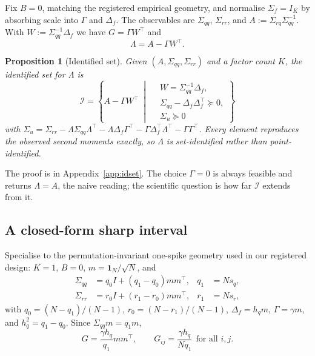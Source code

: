 \documentclass[10pt,twocolumn]{article}
\newtheorem{proposition}{Proposition}
\theoremstyle{remark}
\begin{document}
Fix $B=0$, matching the registered empirical geometry, and normalise
$\Sigma_f=I_K$ by absorbing scale into $\Gamma$ and $\Delta_f$. The observables
are $\Sigma_{qq}$, $\Sigma_{rr}$, and $A:=\Sigma_{rq}\Sigma_{qq}^{-1}$. With
$W:=\Sigma_{qq}^{-1}\Delta_f$ we have $G=\Gamma W^\top$ and
\begin{equation}
\Lambda = A-\Gamma W^\top. \label{eq:lamAW}
\end{equation}

\begin{proposition}[Identified set]
\label{prop:idset}
Given $(A,\Sigma_{qq},\Sigma_{rr})$ and a factor count $K$, the identified set
for $\Lambda$ is
\begin{equation}
\mathcal I=\left\{A-\Gamma W^\top\ \middle|\
\begin{aligned}
&W=\Sigma_{qq}^{-1}\Delta_f,\\
&\Sigma_{qq}-\Delta_f\Delta_f^\top\succeq0,\\
&\Sigma_u\succeq0
\end{aligned}\right\}
\label{eq:idset}
\end{equation}
with $\Sigma_u=\Sigma_{rr}-\Lambda\Sigma_{qq}\Lambda^\top
-\Lambda\Delta_f\Gamma^\top-\Gamma\Delta_f^\top\Lambda^\top-\Gamma\Gamma^\top$.
Every element reproduces the observed second moments exactly, so $\Lambda$ is
set-identified rather than point-identified.
\end{proposition}

The proof is in Appendix~\ref{app:idset}. The choice $\Gamma=0$ is always
feasible and returns $\Lambda=A$, the naive reading; the scientific question is
how far $\mathcal I$ extends from it.

\subsection{A closed-form sharp interval}

Specialise to the permutation-invariant one-spike geometry used in our
registered design: $K=1$, $B=0$, $m=\mathbf 1_N/\sqrt N$, and
\begin{align}
\Sigma_{qq} &= q_0I+(q_1-q_0)mm^\top, & q_1&=Ns_q, \\
\Sigma_{rr} &= r_0I+(r_1-r_0)mm^\top, & r_1&=Ns_r,
\end{align}
with $q_0=(N-q_1)/(N-1)$, $r_0=(N-r_1)/(N-1)$, $\Delta_f=h_qm$, $\Gamma=\gamma
m$, and $h_q^2=q_1-q_0$. Since $\Sigma_{qq}m=q_1m$,
\begin{equation}
G=\frac{\gamma h_q}{q_1}mm^\top,
\qquad
G_{ij}=\frac{\gamma h_q}{Nq_1}\ \ \text{for all }i,j.
\label{eq:constgap}
\end{equation}
\end{document}
